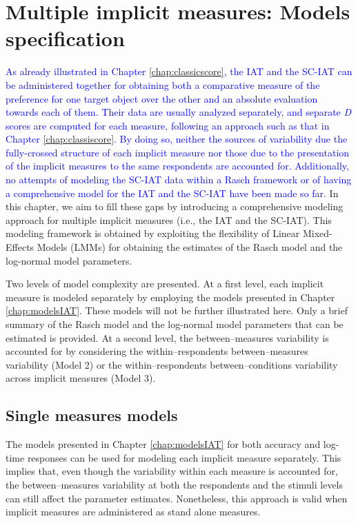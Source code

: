 \documentclass[12pt]{book}
\begin{document}
\chapter[Multiple implicit measures: Models specification]{Multiple implicit measures: Models specification} \label{chap:comprehensiveModels}

\textcolor{blue}{As already illustrated in Chapter \ref{chap:classicscore}, the IAT and the SC-IAT can be administered together for obtaining both a comparative measure of the preference for one target object over the other and an absolute evaluation towards each of them. 
	Their data are usually analyzed separately, and separate \emph{D} scores are computed for each measure, following an approach such as that in Chapter \ref{chap:classiscore}. 
	By doing so, neither the sources of variability due the fully-crossed structure of each implicit measure nor those due to the presentation of the implicit measures to the same respondents are accounted for.}
\textcolor{blue}{Additionally, no attempts of modeling the SC-IAT data within a Rasch framework or of having a comprehensive model for the IAT and the SC-IAT have been made so far.} 
In this chapter, we aim to fill these gaps by introducing a comprehensive modeling approach for multiple implicit measures (i.e., the IAT and the SC-IAT). This modeling framework is obtained by exploiting the flexibility of Linear Mixed-Effects Models (LMMs) for obtaining the estimates of the Rasch model and the log-normal model parameters. 

Two levels of model complexity are presented. 
At a first level, each implicit measure is modeled separately by employing the models presented in Chapter \ref{chap:modelsIAT}. 
These models will not be further illustrated here. Only a brief summary of the Rasch model and the log-normal model parameters that can be estimated is provided.
At a second level, the between--measures variability is accounted for by considering the within--respondents between--measures variability (Model 2) or the within--respondents between--conditions variability across implicit measures (Model 3). 


\section{Single measures models} \label{sec:singleModels}

The models presented in Chapter \ref{chap:modelsIAT} for both accuracy and log-time responses can be used for modeling each implicit measure separately. 
This implies that, even though the variability within each measure is accounted for, the between--measures variability at both the respondents and the stimuli levels can still affect the parameter estimates.
Nonetheless, this approach is valid when implicit measures are administered as stand alone measures. 
\end{document}
